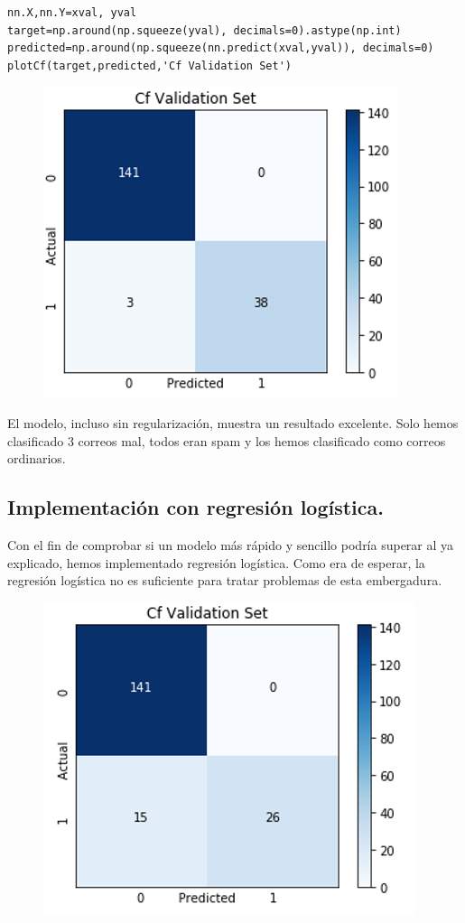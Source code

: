 \documentclass[a4paper,10pt]{article}
\begin{document}
\begin{lstlisting}
nn.X,nn.Y=xval, yval 
target=np.around(np.squeeze(yval), decimals=0).astype(np.int)
predicted=np.around(np.squeeze(nn.predict(xval,yval)), decimals=0)
plotCf(target,predicted,'Cf Validation Set')
\end{lstlisting}
\begin{figure}[H]
\centering
\includegraphics[scale=0.8]{Annotation 2020-03-23 190419}
\end{figure}
El modelo, incluso sin regularización, muestra un resultado excelente. Solo hemos clasificado 3 correos mal, todos eran spam y los hemos clasificado como correos ordinarios.

\subsection{Implementación con regresión logística.}
Con el fin de comprobar si un modelo más rápido y sencillo podría superar al ya explicado, hemos implementado regresión logística. Como era de esperar, la regresión logística no es suficiente para tratar problemas de esta embergadura.
\begin{figure}[H]
\centering
\includegraphics[scale=0.8]{Annotation 2020-03-23 193133.png}
\end{figure}
\newpage
\end{document}
